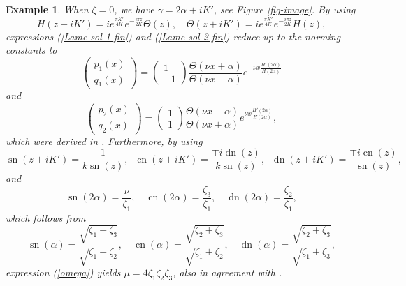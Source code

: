 \documentclass[12pt,reqno]{amsart}
\numberwithin{equation}{section}
\DeclareMathOperator{\sn}{sn}
\DeclareMathOperator{\cn}{cn}
\DeclareMathOperator{\dn}{dn}
\newtheorem{example}{Example}
\begin{document}
\begin{example}
	When $\zeta = 0$, we have $\gamma = 2 \alpha + i K'$, see Figure \ref{fig-image}. By using 
	\begin{equation}
	\label{Wei-Jac-3}
	H(z+iK') = i e^{\frac{\pi K'}{4 K}} e^{-\frac{i \pi z}{2K}} \Theta(z), \quad 
	\Theta(z+iK') = i e^{\frac{\pi K'}{4 K}} e^{-\frac{i \pi z}{2K}} H(z),
	\end{equation}
	expressions (\ref{Lame-sol-1-fin}) and (\ref{Lame-sol-2-fin}) reduce up to the norming constants to 
	\begin{equation}
	\label{exact-2}
	\left( \begin{matrix} p_1(x) \\ q_1(x) \end{matrix} \right) = 
	\left( \begin{matrix} 1 \\ -1 \end{matrix} \right) \frac{\Theta(\nu x + \alpha)}{\Theta(\nu x - \alpha)} e^{-\nu x \frac{H'(2\alpha)}{H(2\alpha)}}
	\end{equation}
	and
	\begin{equation}
	\label{exact-1}
	\left( \begin{matrix} p_2(x) \\ q_2(x) \end{matrix} \right) = 
	\left( \begin{matrix} 1 \\ 1 \end{matrix} \right) \frac{\Theta(\nu x - \alpha)}{\Theta(\nu x + \alpha)} 
	e^{\nu x \frac{H'(2\alpha)}{H(2\alpha)}},
	\end{equation}
	which were derived in \cite{AP25}. Furthermore, by using 
	\begin{equation}
	\label{rel-2}
	\sn(z \pm i K') = \frac{1}{k \sn(z)}, \;\; \cn(z \pm i K') = \frac{\mp i \dn(z)}{k \sn(z)}, \;\; 
	\dn(z \pm i K') = \frac{\mp i \cn(z)}{\sn(z)},
	\end{equation}
	and
	\begin{equation}
	\label{elliptic-double-alpha}
	\sn(2\alpha) = \frac{\nu}{\zeta_1}, \quad \cn(2\alpha) = \frac{\zeta_3}{\zeta_1}, \quad \dn(2\alpha) = \frac{\zeta_2}{\zeta_1},
	\end{equation}
	which follows from 
	\begin{equation}
	\label{elliptic-alpha}
	\sn(\alpha) = \frac{\sqrt{\zeta_1 - \zeta_3}}{\sqrt{\zeta_1 + \zeta_2}}, \quad 
	\cn(\alpha) = \frac{\sqrt{\zeta_2 + \zeta_3}}{\sqrt{\zeta_1 + \zeta_2}}, \quad 
	\dn(\alpha) = \frac{\sqrt{\zeta_2 + \zeta_3}}{\sqrt{\zeta_1 + \zeta_3}},
	\end{equation} 
	expression (\ref{omega}) yields $\mu = 4 \zeta_1 \zeta_2 \zeta_3$, also in agreement with \cite{AP25}.
\end{example}
\end{document}
